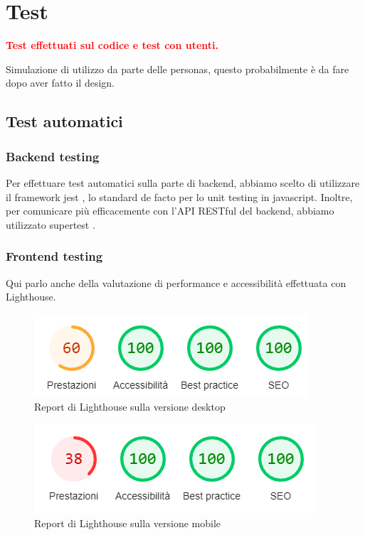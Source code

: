 \documentclass{article}
\begin{document}
\section{Test}
\textcolor{red}{\textbf{Test effettuati sul codice e test con utenti.}}

Simulazione di utilizzo da parte delle personas, questo probabilmente è da fare dopo aver fatto il design.

\subsection{Test automatici}
\subsubsection{Backend testing}
Per effettuare test automatici sulla parte di backend, abbiamo scelto di utilizzare il framework jest , lo standard de facto per lo unit testing in javascript. Inoltre, per comunicare più efficacemente con l'API RESTful del backend, abbiamo utilizzato supertest .

\subsubsection{Frontend testing}
Qui parlo anche della valutazione di performance e accessibilità effettuata con Lighthouse.

\begin{figure}
	\centering
	\includegraphics[scale=0.7]{lighthouse_report_desktop}
	\caption{Report di Lighthouse sulla versione desktop}
	\label{fig:lighthouse_report_desktop}
\end{figure}

\begin{figure}
	\centering
	\includegraphics[scale=0.7]{lighthouse_report_mobile}
	\caption{Report di Lighthouse sulla versione mobile}
	\label{fig:lighthouse_report_mobile}
\end{figure}
\end{document}
